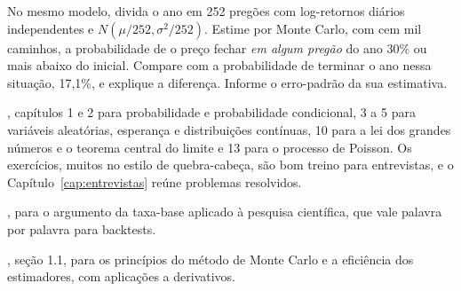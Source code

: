 \begin{exercicios}
  \item\label{ex:c03-barreira}  No mesmo modelo, divida o ano em 252 pregões com log-retornos diários independentes e $N(\mu/252, \sigma^2/252)$. Estime por Monte Carlo, com cem mil caminhos, a probabilidade de o preço fechar \emph{em algum pregão} do ano 30\% ou mais abaixo do inicial. Compare com a probabilidade de terminar o ano nessa situação, 17,1\%, e explique a diferença. Informe o erro-padrão da sua estimativa.
\end{exercicios}

\begin{leituras}
  \item \citet{blitzstein2019}, capítulos 1 e 2 para probabilidade e probabilidade condicional, 3 a 5 para variáveis aleatórias, esperança e distribuições contínuas, 10 para a lei dos grandes números e o teorema central do limite e 13 para o processo de Poisson. Os exercícios, muitos no estilo de quebra-cabeça, são bom treino para entrevistas, e o Capítulo~\ref{cap:entrevistas} reúne problemas resolvidos.
  \item \citet{ioannidis2005}, para o argumento da taxa-base aplicado à pesquisa científica, que vale palavra por palavra para backtests.
  \item \citet{glasserman2004}, seção 1.1, para os princípios do método de Monte Carlo e a eficiência dos estimadores, com aplicações a derivativos.
\end{leituras}
